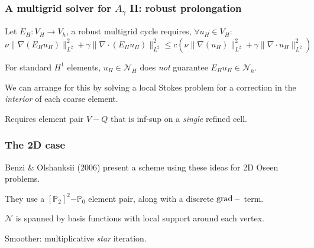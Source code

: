 \documentclass[presentation]{beamer}
\DeclareMathOperator{\grad}{grad}
\let\div\relax
\DeclareMathOperator{\div}{div}
\newcommand{\PtwoPzero}{\ensuremath{[\mathbb{P}_2]^2\mathrm{-}\mathbb{P}_0}\xspace}
\begin{document}
\begin{frame}
  \frametitle{A multigrid solver for $A_\gamma$ II: robust
    prolongation}

  \begin{theorem}
    Let $E_H : V_H \to V_h$, a robust multigrid cycle requires,
    $\forall u_H \in V_H$:
    \begin{equation*}
      \nu \|\nabla(E_H u_H)\|^2_{L^2} + \gamma \|\nabla\cdot (E_H
      u_H)\|^2_{L^2} \le c (\nu \|\nabla(u_H)\|^2_{L^2} + \gamma \|\nabla\cdot u_H\|^2_{L^2})
    \end{equation*}
  \end{theorem}

  For standard $H^1$ elements, $u_H \in \mathcal{N}_H$ does \emph{not}
  guarantee $E_H u_H \in \mathcal{N}_h$.

  We can arrange for this by solving a local Stokes problem for a
  correction in the \emph{interior} of each coarse element.

  Requires element pair $V-Q$ that is inf-sup on a \emph{single}
  refined cell.
\end{frame}

\begin{frame}
  \frametitle{The 2D case}
  Benzi \& Olshanksii (2006) present a scheme using these ideas for 2D
  Oseen problems.

  They use a $\PtwoPzero$ element pair, along with a discrete
  $\grad-\div$ term.

  $\mathcal{N}$ is spanned by basis functions with local support
  around each vertex.

  Smoother: multiplicative \emph{star} iteration.
\end{frame}
\end{document}
